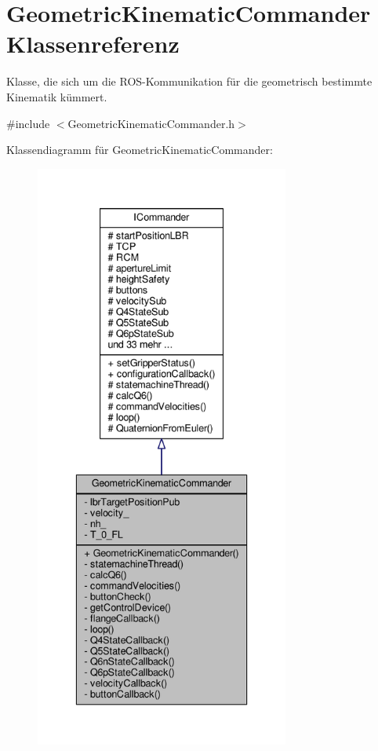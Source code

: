 \hypertarget{classGeometricKinematicCommander}{\section{Geometric\-Kinematic\-Commander Klassenreferenz}
\label{classGeometricKinematicCommander}
}


Klasse, die sich um die R\-O\-S-\/\-Kommunikation für die geometrisch bestimmte Kinematik kümmert.  




{\ttfamily \#include $<$Geometric\-Kinematic\-Commander.\-h$>$}



Klassendiagramm für Geometric\-Kinematic\-Commander\-:
\nopagebreak
\begin{figure}[H]
\begin{center}
\leavevmode
\includegraphics[height=550pt]{classGeometricKinematicCommander__inherit__graph}
\end{center}
\end{figure}


